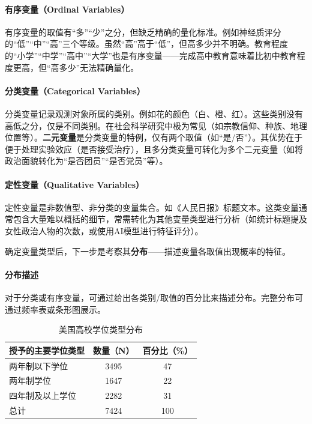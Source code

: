 \paragraph*{有序变量（Ordinal Variables）}
有序变量的取值有``多''``少''之分，但缺乏精确的量化标准。例如神经质评分的``低''``中''``高''三个等级。虽然``高''高于``低''，但高多少并不明确。教育程度的``小学''``中学''``高中''``大学''也是有序变量——完成高中教育意味着比初中教育程度更高，但``高多少''无法精确量化。

\paragraph*{分类变量（Categorical Variables）}
分类变量记录观测对象所属的类别。例如花的颜色（白、橙、红）。这些类别没有高低之分，仅是不同类别。在社会科学研究中极为常见（如宗教信仰、种族、地理位置等）。\textbf{二元变量}是分类变量的特例，仅有两个取值（如``是/否''）。其优势在于便于处理实验效应（是否接受治疗），且多分类变量可转化为多个二元变量（如将政治面貌转化为``是否团员''``是否党员''等）。

\paragraph*{定性变量（Qualitative Variables）}
定性变量是非数值型、非分类的变量集合。如《人民日报》标题文本。这类变量通常包含大量难以概括的细节，常需转化为其他变量类型进行分析（如统计标题提及女性政治人物的次数，或使用AI模型进行特征评分）。

\begin{flushleft}
确定变量类型后，下一步是考察其\textbf{分布}——描述变量各取值出现概率的特征。
\end{flushleft}

\paragraph*{分布描述}
对于分类或有序变量，可通过给出各类别/取值的百分比来描述分布。完整分布可通过频率表或条形图展示。

\begin{table}[h]
	\centering
	\renewcommand{\arraystretch}{1.5}
	\caption{美国高校学位类型分布}
	\begin{tabularx}{1\linewidth}{>{\raggedright\arraybackslash}Xcc}
		\toprule
		授予的主要学位类型 & 数量（N） & 百分比（\%） \\
		\midrule
		两年制以下学位 & 3495 & 47 \\
		两年制学位 & 1647 & 22 \\
		四年制及以上学位 & 2282 & 31 \\
		总计 & 7424 & 100 \\
		\bottomrule
	\end{tabularx}
\end{table}

